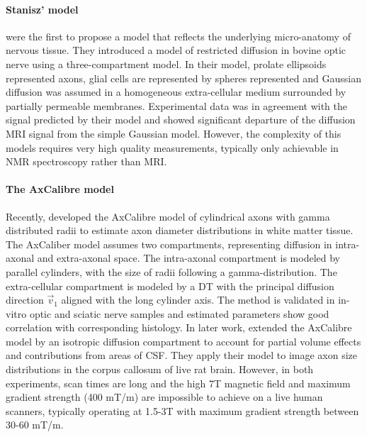 \paragraph*{Stanisz' model}
\cite{Stanisz:1997} were the first to propose a model that reflects the underlying micro-anatomy of nervous tissue. They introduced a model of restricted diffusion in bovine optic nerve using a three-compartment model. In their model, prolate ellipsoids represented axons, glial cells are represented by spheres represented and Gaussian diffusion was assumed in a homogeneous extra-cellular medium surrounded by partially permeable membranes. Experimental data was in agreement with the signal predicted by their model and showed significant departure of the diffusion MRI signal from the simple Gaussian model. However, the complexity of this models requires very high quality measurements, typically only achievable in NMR spectroscopy rather than MRI.
\paragraph*{The AxCalibre model}
Recently, \citet{Assaf:2008} developed the AxCalibre model of cylindrical axons with gamma distributed radii to estimate axon diameter distributions in white matter tissue. The AxCaliber model assumes two compartments, representing diffusion in intra-axonal and extra-axonal space. The intra-axonal compartment is modeled by parallel cylinders, with the size of radii following a gamma-distribution. The extra-cellular compartment is modeled by a DT with the principal diffusion direction $\vec{v}_1$ aligned with the long cylinder axis. The method is validated in in-vitro optic and sciatic nerve samples and estimated parameters show good correlation with corresponding histology. In later work, \citet{Barazany:2009} extended the AxCalibre model by an isotropic diffusion compartment to account for partial volume effects and contributions from areas of CSF. They apply their model to image axon size distributions in the corpus callosum of live rat brain. However, in both experiments, scan times are long and the high 7T magnetic field and maximum gradient strength (400 mT/m) are impossible to achieve on a live human scanners, typically operating at 1.5-3T with maximum gradient strength between 30-60 mT/m. 
